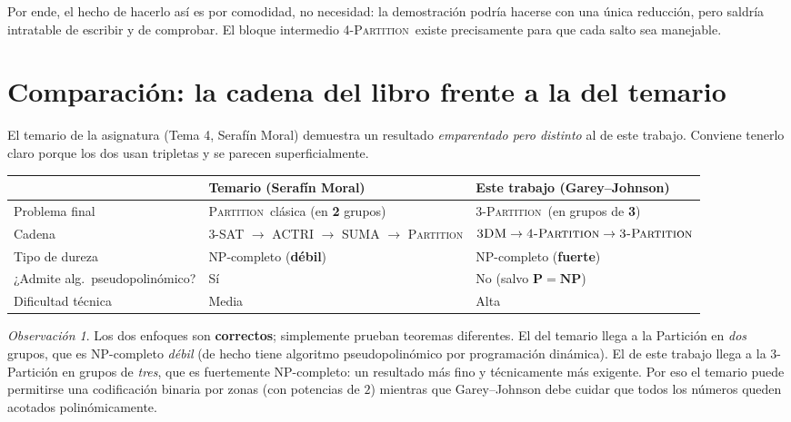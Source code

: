 \documentclass[12pt,a4paper]{article}
\theoremstyle{definition}
\theoremstyle{remark}
\newtheorem{remark}{Observación}
\newcommand{\TPART}{\textsc{3-Partition}}
\newcommand{\FPART}{\textsc{4-Partition}}
\newcommand{\DM}{\textsc{3DM}}
\newcommand{\PART}{\textsc{Partition}}
\begin{document}
\begin{intuicion}
Por ende, el hecho de hacerlo así es por comodidad, no necesidad: la demostración podría hacerse
con una única reducción, pero saldría intratable de escribir y de comprobar. El
bloque intermedio \FPART\ existe precisamente para que cada salto sea manejable.
\end{intuicion}

\section{Comparación: la cadena del libro frente a la del temario}
\label{sec:comparacion}

El temario de la asignatura (Tema 4, Serafín Moral) demuestra un resultado
\emph{emparentado pero distinto} al de este trabajo. Conviene tenerlo claro porque
los dos usan tripletas y se parecen superficialmente.

\begin{center}
\begin{tabular}{p{4.3cm} p{5.0cm} p{4.6cm}}
\toprule
 & \textbf{Temario (Serafín Moral)} & \textbf{Este trabajo (Garey--Johnson)} \\
\midrule
Problema final & \PART\ clásica (en \textbf{2} grupos) & \TPART\ (en grupos de \textbf{3}) \\
Cadena & 3-SAT $\to$ ACTRI $\to$ SUMA $\to$ \PART & $\DM \to \FPART \to \TPART$ \\
Tipo de dureza & NP-completo (\textbf{débil}) & NP-completo (\textbf{fuerte}) \\
¿Admite alg.\ pseudopolinómico? & Sí & No (salvo $\mathbf{P}=\mathbf{NP}$) \\
Dificultad técnica & Media & Alta \\
\bottomrule
\end{tabular}
\end{center}

\begin{remark}
Los dos enfoques son \textbf{correctos}; simplemente prueban teoremas diferentes.
El del temario llega a la Partición en \emph{dos} grupos, que es NP-completo
\emph{débil} (de hecho tiene algoritmo pseudopolinómico por programación dinámica).
El de este trabajo llega a la 3-Partición en grupos de \emph{tres}, que es
fuertemente NP-completo: un resultado más fino y técnicamente más exigente. Por eso
el temario puede permitirse una codificación binaria por zonas (con potencias de
$2$) mientras que Garey--Johnson debe cuidar que todos los números queden acotados
polinómicamente.
\end{remark}
\end{document}
